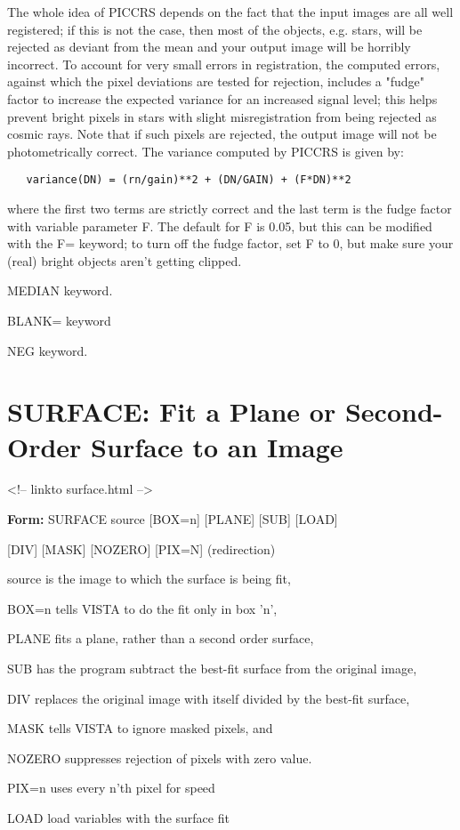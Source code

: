 The whole idea of PICCRS depends on the fact that the input images are all
well registered; if this is not the case, then most of the objects,
e.g. stars, will be rejected as deviant from the mean and your output image
will be horribly incorrect. To account for very small errors in
registration, the computed errors, against which the pixel deviations are
tested for rejection, includes a "fudge" factor to increase the expected
variance for an increased signal level; this helps prevent bright pixels in
stars with slight misregistration from being rejected as cosmic rays. Note
that if such pixels are rejected, the output image will not be
photometrically correct. The variance computed by PICCRS is given by:
\begin{verbatim}
   variance(DN) = (rn/gain)**2 + (DN/GAIN) + (F*DN)**2
\end{verbatim}
where the first two terms are strictly correct and the last term is the
fudge factor with variable parameter F. The default for F is 0.05, but this
can be modified with the F= keyword; to turn off the fudge factor, set F to
0, but make sure your (real) bright objects aren't getting clipped.

 MEDIAN keyword.

 BLANK= keyword

 NEG keyword.

\section{SURFACE: Fit a Plane or Second-Order Surface to an Image}
\begin{rawhtml}
<!-- linkto surface.html -->
\end{rawhtml}

\begin{command}
  \item[\textbf{Form: }SURFACE source {[BOX=n]} {[PLANE]} {[SUB]} 
       {[LOAD]}\hfill]{}
  \item{{[DIV]} {[MASK]} {[NOZERO]} {[PIX=N]} (redirection)}
  \item[source]{is the image to which the surface is being fit,}
  \item[BOX=n]{tells VISTA to do the fit only in box 'n',}
  \item[PLANE]{fits a plane, rather than a second order surface,}
  \item[SUB]{has the program subtract the best-fit surface
       from the original image,}
  \item[DIV]{replaces the original image with itself divided by the 
       best-fit surface,}
  \item[MASK]{tells VISTA to ignore masked pixels, and}
  \item[NOZERO]{suppresses rejection of pixels with zero value.}
  \item[PIX=n]{uses every n'th pixel for speed}
  \item[LOAD]{load variables with the surface fit}
\end{command}

